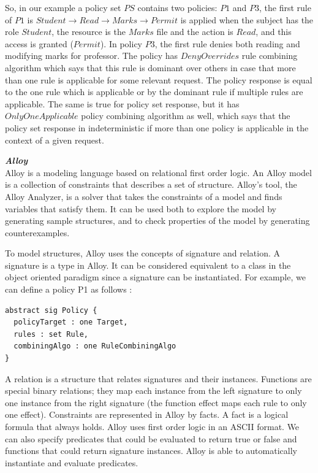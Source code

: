 \documentclass{acm_proc_article-sp}
\begin{document}
So, in our example a policy set $PS$ contains two policies: $P1$ and $P3$, the first rule of $P1$ is $Student \to Read \to Marks \to Permit $ is applied when the subject has the role $Student$, the resource is the $Marks$ file and the action is $Read$, and this access is granted ($Permit$). In policy $P3$, the first rule denies both reading and modifying marks for professor. The policy has $DenyOverrides$ rule combining algorithm which says that this rule is dominant over others in case that more than one rule is applicable for some relevant request. The policy response is equal to the one rule which is applicable or by the dominant rule if multiple rules are applicable. The same is true for policy set response, but it has $OnlyOneApplicable$ policy combining algorithm as well, which says that the policy set response in indeterministic if more than one policy is applicable in the context of a given request.

\textbf{\emph{Alloy}}\\
Alloy \cite{jackson:alloy} is a modeling language based on relational first order logic. An Alloy model is a collection of constraints that describes a set of structure. Alloy's tool, the Alloy Analyzer, is a solver that takes the constraints of a model and finds variables that satisfy them. It can be used both to explore the model by generating sample structures, and to check properties of the model by generating counterexamples. 

To model structures, Alloy uses the concepts of signature and relation. A signature is a type in Alloy. It can be considered equivalent to a class in the object oriented paradigm since a signature can be instantiated. For example, we can define a policy P1 as follows \cite{acp:alloy}:
 
 \begin{verbatim}
abstract sig Policy {
  policyTarget : one Target,
  rules : set Rule,
  combiningAlgo : one RuleCombiningAlgo
} 
\end{verbatim}

A relation is a structure that relates signatures and their instances. Functions are special binary relations; they map each instance from the left signature to only one instance from the right signature (the function effect maps each rule to only one effect). Constraints are represented in Alloy by facts. A fact is a logical formula that always holds. Alloy uses first order logic in an ASCII format. We can also specify predicates that could be evaluated to return true or false and functions that could return signature instances. Alloy is able to automatically instantiate and evaluate predicates.
\end{document}
